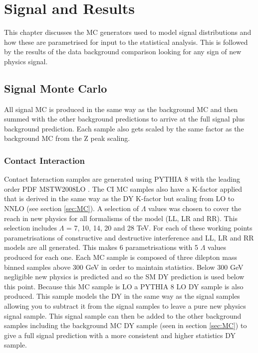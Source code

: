 \chapter{Signal and Results}

This chapter discusses the MC generators used to model signal distributions and how these are parametrised for input to the statistical analysis. This is followed by the results of the data background comparison looking for any sign of new physics signal.

\section{Signal Monte Carlo}

	All signal MC is produced in the same way as the background MC and then summed with the other background predictions to arrive at the full signal plus background prediction. Each sample also gets scaled by the same factor as the background MC from the Z peak scaling. \\


	\subsection*{Contact Interaction}

	Contact Interaction samples are generated using PYTHIA 8 \cite{Sjostrand:2007gs} with the leading order PDF MSTW2008LO \cite{Martin:2009iq}. The CI MC samples also have a K-factor applied that is derived in the same way as the DY K-factor but scaling from LO to NNLO (see section \ref{sec:MC}). A selection of $\Lambda$ values was chosen to cover the reach in new physics for all formalisms of the model (LL, LR and RR). This selection includes $\Lambda$ = 7, 10, 14, 20 and 28 TeV. For each of these working points parametrisations of constructive and destructive interference and LL, LR and RR models are all generated. This makes 6 parametrisations with 5 $\Lambda$ values produced for each one. Each MC sample is composed of three dilepton mass binned samples above 300 GeV in order to maintain statistics. Below 300 GeV negligible new physics is predicted and so the SM DY prediction is used below this point. 
	Because this MC sample is LO a PYTHIA 8 LO DY sample is also produced. This sample models the DY in the same way as the signal samples allowing you to subtract it from the signal samples to leave a pure new physics signal sample. This signal sample can then be added to the other background samples including the background MC DY sample (seen in section \ref{sec:MC}) to give a full signal prediction with a more consistent and higher statistics DY sample.



